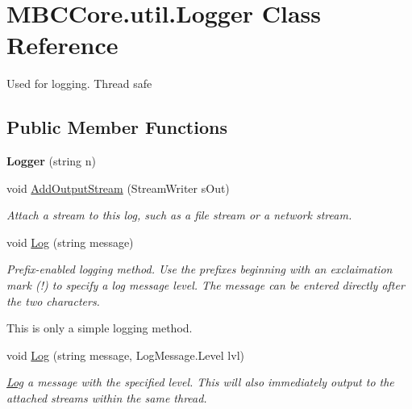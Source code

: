 \hypertarget{class_m_b_c_core_1_1util_1_1_logger}{\section{M\-B\-C\-Core.\-util.\-Logger Class Reference}
\label{class_m_b_c_core_1_1util_1_1_logger}
}


Used for logging. Thread safe 


\subsection*{Public Member Functions}
\begin{DoxyCompactItemize}
\item 
\hypertarget{class_m_b_c_core_1_1util_1_1_logger_af266c3aa3098332f0cc6445de23a5821}{{\bfseries Logger} (string n)}\label{class_m_b_c_core_1_1util_1_1_logger_af266c3aa3098332f0cc6445de23a5821}

\item 
\hypertarget{class_m_b_c_core_1_1util_1_1_logger_a973c7abc12053a00ccf84b543b12c9cd}{void \hyperlink{class_m_b_c_core_1_1util_1_1_logger_a973c7abc12053a00ccf84b543b12c9cd}{Add\-Output\-Stream} (Stream\-Writer s\-Out)}\label{class_m_b_c_core_1_1util_1_1_logger_a973c7abc12053a00ccf84b543b12c9cd}

\begin{DoxyCompactList}\small\item\em Attach a stream to this log, such as a file stream or a network stream.\end{DoxyCompactList}\item 
void \hyperlink{class_m_b_c_core_1_1util_1_1_logger_ad79aa6e76e7350f1f04331fe6747d11d}{Log} (string message)
\begin{DoxyCompactList}\small\item\em Prefix-\/enabled logging method. Use the prefixes beginning with an exclaimation mark (!) to specify a log message level. The message can be entered directly after the two characters.\par
 This is only a simple logging method.\par
 \end{DoxyCompactList}\item 
\hypertarget{class_m_b_c_core_1_1util_1_1_logger_ae17e4cc05b1a9425b8517355188148cd}{void \hyperlink{class_m_b_c_core_1_1util_1_1_logger_ae17e4cc05b1a9425b8517355188148cd}{Log} (string message, Log\-Message.\-Level lvl)}\label{class_m_b_c_core_1_1util_1_1_logger_ae17e4cc05b1a9425b8517355188148cd}

\begin{DoxyCompactList}\small\item\em \hyperlink{class_m_b_c_core_1_1util_1_1_log}{Log} a message with the specified level. This will also immediately output to the attached streams within the same thread.\end{DoxyCompactList}\end{DoxyCompactItemize}


